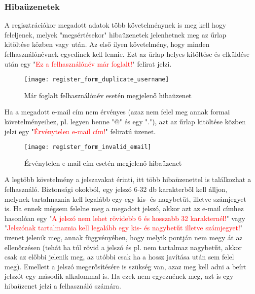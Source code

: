 \subsubsection{Hibaüzenetek}
\label{subsubsec:user_register_errors}

A regisztrációkor megadott adatok több követelménynek is meg kell hogy feleljenek, melyek "megsértésekor" hibaüzenetek jelenhetnek meg az űrlap kitöltése közben vagy után. Az első ilyen követelmény, hogy minden felhasználónévnek egyedinek kell lennie. Ezt az űrlap helyes kitöltése és elküldése után egy "\textcolor{red}{Ez a felhasználónév már foglalt!}" felirat jelzi.

\begin{figure}[H]
	\centering
	\texttt{[image: register\_form\_duplicate\_username]}
	\caption{Már foglalt felhasználónév esetén megjelenő hibaüzenet}
	\label{fig:register_form_duplicate_username}
\end{figure}

Ha a megadott e-mail cím nem érvényes (azaz nem felel meg annak formai követelményeihez, pl. legyen benne "@" és egy "."), azt az űrlap kitöltése közben jelzi egy "\textcolor{red}{Érvénytelen e-mail cím!}" feliratú üzenet.

\begin{figure}[H]
	\centering
	\texttt{[image: register\_form\_invalid\_email]}
	\caption{Érvénytelen e-mail cím esetén megjelenő hibaüzenet}
	\label{fig:register_form_invalid_email}
\end{figure}

A legtöbb követelmény a jelszavakat érinti, itt több hibaüzenettel is találkozhat a felhasználó. Biztonsági okokból, egy jelszó 6-32 db karakterből kell álljon, melynek tartalmaznia kell legalább egy-egy kis- és nagybetűt, illetve számjegyet is. Ha ennek mégsem felelne meg a megadott jelszó, akkor azt az e-mail címhez hasonlóan egy "\textcolor{red}{A jelszó nem lehet rövidebb 6 és hosszabb 32 karakternél!}" vagy "\textcolor{red}{Jelszónak tartalmaznia kell legalább egy kis- és nagybetűt illetve számjegyet!}" üzenet jelenik meg, annak függvényében, hogy melyik pontján nem megy át az ellenőrzésen (tehát ha túl rövid a jelszó és pl. nem tartalmaz nagybetűt, akkor csak az előbbi jelenik meg, az utóbbi csak ha a hossz javítása után sem felel meg). Emellett a jelszó megerősítésére is szükség van, azaz meg kell adni a beírt jelszót egy második alkalommal is. Ha ezek nem egyeznének meg, azt is egy hibaüzenet jelzi a felhasználó számára.

